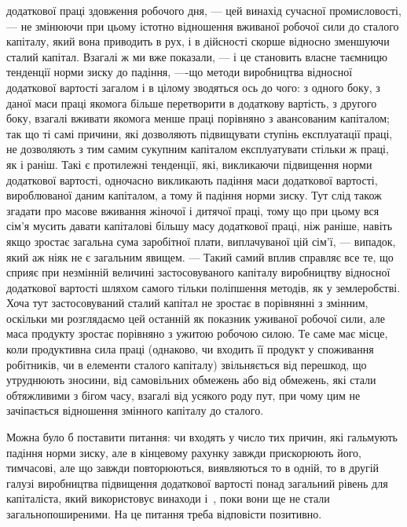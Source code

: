 \parcont{}  %
додаткової праці здовження робочого дня, — цей винахід сучасної промисловості, — не змінюючи при
цьому істотно відношення вживаної робочої сили до сталого капіталу, який вона приводить в рух, і в
дійсності скорше відносно зменшуючи сталий капітал. Взагалі ж ми вже показали, — і це становить
власне таємницю тенденції норми зиску до падіння, —-що методи виробництва відносної додаткової
вартості загалом і в цілому зводяться ось до чого: з одного боку, з даної маси праці якомога більше
перетворити в додаткову вартість, з другого боку, взагалі вживати якомога менше праці порівняно з
авансованим капіталом; так що ті самі причини, які дозволяють підвищувати ступінь експлуатації
праці, не дозволяють з тим самим сукупним капіталом експлуатувати стільки ж праці, як і раніш. Такі
є протилежні тенденції, які, викликаючи підвищення норми додаткової вартості, одночасно викликають
падіння маси додаткової вартості, вироблюваної даним капіталом, а тому й падіння норми зиску. Тут
слід також згадати про масове вживання жіночої і дитячої праці, тому що при цьому вся сім’я мусить
давати капіталові більшу масу додаткової праці, ніж раніше, навіть якщо зростає загальна сума
заробітної плати, виплачуваної цій сім’ї, — випадок, який аж ніяк не є загальним явищем. — Такий
самий вплив справляє все те, що сприяє при незмінній величині застосовуваного капіталу виробництву
відносної додаткової вартості шляхом самого тільки поліпшення методів, як у землеробстві. Хоча тут
застосовуваний сталий капітал не зростає в порівнянні з змінним, оскільки ми розглядаємо цей
останній як показник уживаної робочої сили, але маса продукту зростає порівняно з ужитою робочою
силою. Те саме має місце, коли продуктивна сила праці (однаково, чи входить її продукт у споживання
робітників, чи в елементи сталого капіталу) звільняється від перешкод, що утруднюють зносини, від
самовільних обмежень або від обмежень, які стали обтяжливими з бігом часу, взагалі від усякого роду
пут, при чому цим не зачіпається відношення змінного капіталу до сталого.

Можна було б поставити питання: чи входять у число тих причин, які гальмують падіння норми зиску,
але в кінцевому рахунку завжди прискорюють його, тимчасові, але що завжди повторюються, виявляються
то в одній, то в другій галузі виробництва підвищення додаткової вартості понад загальний рівень для
капіталіста, який використовує винаходи і~, поки вони ще не стали загальнопоширеними. На це
питання треба відповісти позитивно.

